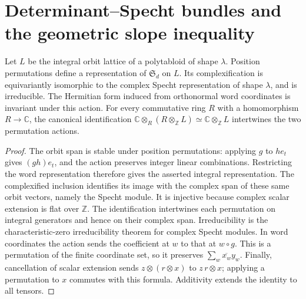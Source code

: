 \chapter{Determinant--Specht bundles and the geometric slope inequality}

\begin{lemma}
\label{lem:arithmetic-specht-action}
\leanok
Let $L$ be the integral orbit lattice of a polytabloid of shape $\lambda$.
Position permutations define a representation of $\mathfrak S_d$ on $L$.
Its complexification is equivariantly isomorphic to the complex Specht
representation of shape $\lambda$, and is irreducible. The Hermitian form
induced from orthonormal word coordinates is invariant under this action.
For every commutative ring $R$ with a homomorphism $R\to\mathbb C$, the
canonical identification
$\mathbb C\otimes_R(R\otimes_{\mathbb Z}L)\simeq
\mathbb C\otimes_{\mathbb Z}L$ intertwines the two permutation actions.
\end{lemma}
\begin{proof}
The orbit span is stable under position permutations: applying $g$ to
$h e_t$ gives $(gh)e_t$, and the action preserves integer linear
combinations. Restricting the word representation therefore gives the
asserted integral representation. The complexified inclusion identifies
its image with the complex span of these same orbit vectors, namely the
Specht module. It is injective because complex scalar extension is flat
over $\mathbb Z$. The identification intertwines each permutation on
integral generators and hence on their complex span. Irreducibility is
the characteristic-zero irreducibility theorem for complex Specht modules.
In word coordinates the action sends the coefficient at $w$ to that at
$w\circ g$. This is a permutation of the finite coordinate set, so it
preserves $\sum_w\overline{x_w}y_w$. Finally, cancellation of scalar
extension sends $z\otimes(r\otimes x)$ to $z\,r\otimes x$; applying
a permutation to $x$ commutes with this formula. Additivity extends the
identity to all tensors.
\end{proof}

